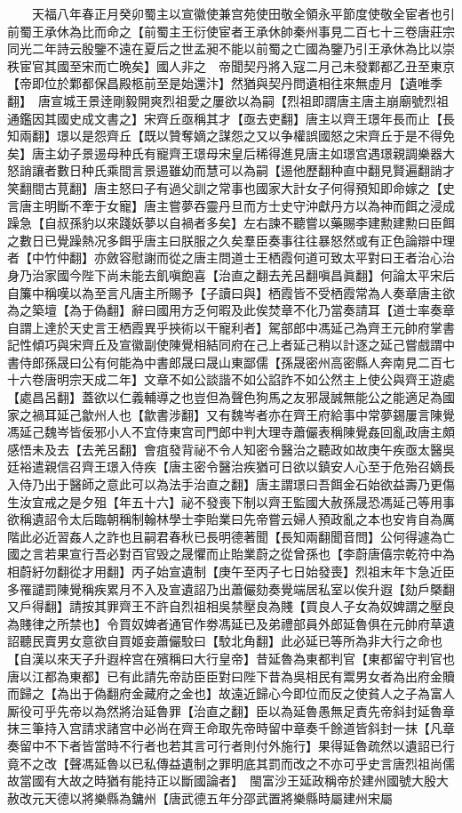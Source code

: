 　　天福八年春正月癸卯蜀主以宣徽使兼宫苑使田敬全領永平節度使敬全宦者也引前蜀王承休為比而命之【前蜀主王衍使宦者王承休帥秦州事見二百七十三卷唐莊宗同光二年詩云殷鑒不遠在夏后之世孟昶不能以前蜀之亡國為鑒乃引王承休為比以崇秩宦官其國至宋而亡晩矣】國人非之　帝聞契丹將入寇二月己未發鄴都乙丑至東京【帝即位於鄴都保昌殿柩前至是始還汴】然猶與契丹問遺相往來無虛月【遺唯季翻】　唐宣城王景逹剛毅開爽烈祖愛之屢欲以為嗣【烈祖即謂唐主唐主崩廟號烈祖通鑑因其國史成文書之】宋齊丘亟稱其才【亟去吏翻】唐主以齊王璟年長而止【長知兩翻】璟以是怨齊丘【既以贊奪嫡之謀怨之又以争權誤國怒之宋齊丘于是不得免矣】唐主幼子景逷母种氏有寵齊王璟母宋皇后稀得進見唐主如璟宫遇璟親調樂器大怒誚讓者數日种氏乘間言景逷雖幼而慧可以為嗣【逷他歷翻种直中翻見賢遍翻誚才笑翻間古莧翻】唐主怒曰子有過父訓之常事也國家大計女子何得預知即命嫁之【史言唐主明斷不牽于女寵】唐主嘗夢吞靈丹旦而方士史守沖獻丹方以為神而餌之浸成躁急【自叔孫豹以來踐妖夢以自禍者多矣】左右諫不聽嘗以藥賜李建勲建勲曰臣餌之數日已覺躁熱况多餌乎唐主曰朕服之久矣羣臣奏事往往暴怒然或有正色論辯中理者【中竹仲翻】亦斂容慰謝而從之唐主問道士王栖霞何道可致太平對曰王者治心治身乃治家國今陛下尚未能去飢嗔飽喜【治直之翻去羌呂翻嗔昌眞翻】何論太平宋后自簾中稱嘆以為至言凡唐主所賜予【子讀曰與】栖霞皆不受栖霞常為人奏章唐主欲為之築壇【為于偽翻】辭曰國用方乏何暇及此俟焚章不化乃當奏請耳【道士率奏章自謂上達於天史言王栖霞異乎挾術以干寵利者】駕部郎中馮延己為齊王元帥府掌書記性傾巧與宋齊丘及宣徽副使陳覺相結同府在己上者延己稍以計逐之延己嘗戲謂中書侍郎孫晟曰公有何能為中書郎晟曰晟山東鄙儒【孫晟密州高密縣人奔南見二百七十六卷唐明宗天成二年】文章不如公談諧不如公諂詐不如公然主上使公與齊王遊處【處昌呂翻】蓋欲以仁義輔導之也豈但為聲色狗馬之友邪晟誠無能公之能適足為國家之禍耳延己歙州人也【歙書涉翻】又有魏岑者亦在齊王府給事中常夢錫屢言陳覺馮延己魏岑皆佞邪小人不宜侍東宫司門郎中判大理寺蕭儼表稱陳覺姦回亂政唐主頗感悟未及去【去羌呂翻】會疽發背祕不令人知密令醫治之聽政如故庚午疾亟太醫吳廷裕遣親信召齊王璟入侍疾【唐主密令醫治疾猶可日欲以鎮安人心至于危殆召嫡長入侍乃出于醫師之意此可以為法手治直之翻】唐主謂璟曰吾餌金石始欲益壽乃更傷生汝宜戒之是夕殂【年五十六】祕不發喪下制以齊王監國大赦孫晟恐馮延己等用事欲稱遺詔令太后臨朝稱制翰林學士李貽業曰先帝嘗云婦人預政亂之本也安肯自為厲階此必近習姦人之詐也且嗣君春秋已長明德著聞【長知兩翻聞音問】公何得遽為亡國之言若果宣行吾必對百官毁之晟懼而止貽業蔚之從曾孫也【李蔚唐僖宗乾符中為相蔚紆勿翻從才用翻】丙子始宣遺制【庚午至丙子七日始發喪】烈祖末年卞急近臣多罹譴罰陳覺稱疾累月不入及宣遺詔乃出蕭儼劾奏覺端居私室以俟升遐【劾戶槩翻又戶得翻】請按其罪齊王不許自烈祖相吳禁壓良為賤【買良人子女為奴婢謂之壓良為賤律之所禁也】令買奴婢者通官作劵馮延已及弟禮部員外郎延魯俱在元帥府草遺詔聽民賣男女意欲自買姬妾蕭儼駮曰【駮北角翻】此必延已等所為非大行之命也【自漢以來天子升遐梓宫在殯稱曰大行皇帝】昔延魯為東都判官【東都留守判官也唐以江都為東都】已有此請先帝訪臣臣對曰陛下昔為吳相民有鬻男女者為出府金贖而歸之【為出于偽翻府金藏府之金也】故遠近歸心今即位而反之使貧人之子為富人厮役可乎先帝以為然將治延魯罪【治直之翻】臣以為延魯愚無足責先帝斜封延魯章抹三筆持入宫請求諸宫中必尚在齊王命取先帝時留中章奏千餘道皆斜封一抹【凡章奏留中不下者皆當時不行者也若其言可行者則付外施行】果得延魯疏然以遺詔已行竟不之改【聲馮延魯以已私傳益遺制之罪明底其罰而改之不亦可乎史言唐烈祖尚儒故當國有大故之時猶有能持正以斷國論者】　閩富沙王延政稱帝於建州國號大殷大赦改元天德以將樂縣為鏞州【唐武德五年分邵武置將樂縣時屬建州宋屬
